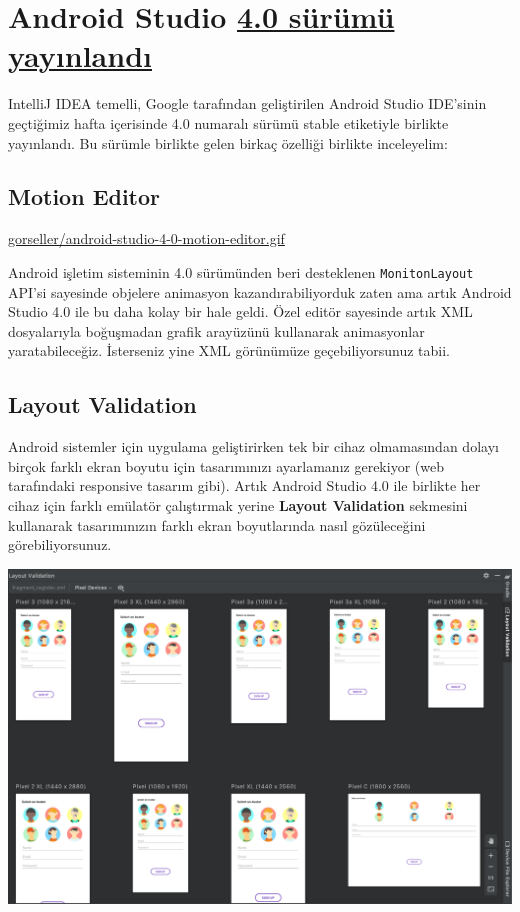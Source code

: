 \documentclass[11pt]{article}
\begin{document}
\section{Android Studio \href{https://android-developers.googleblog.com/2020/05/android-studio-4.html}{4.0 sürümü yayınlandı}}
\label{sec:org8a8a75c}
IntelliJ IDEA temelli, Google tarafından geliştirilen Android Studio IDE'sinin
geçtiğimiz hafta içerisinde 4.0 numaralı sürümü stable etiketiyle birlikte
yayınlandı. Bu sürümle birlikte gelen birkaç özelliği birlikte inceleyelim:

\subsection{Motion Editor}
\label{sec:org42453e6}
\url{gorseller/android-studio-4-0-motion-editor.gif}

Android işletim sisteminin 4.0 sürümünden beri desteklenen \texttt{MonitonLayout}
API'si sayesinde objelere animasyon kazandırabiliyorduk zaten ama artık
Android Studio 4.0 ile bu daha kolay bir hale geldi. Özel editör sayesinde
artık XML dosyalarıyla boğuşmadan grafik arayüzünü kullanarak animasyonlar
yaratabileceğiz. İsterseniz yine XML görünümüze geçebiliyorsunuz tabii.
\subsection{Layout Validation}
\label{sec:orgcc9f237}
Android sistemler için uygulama geliştirirken tek bir cihaz olmamasından
dolayı birçok farklı ekran boyutu için tasarımınızı ayarlamanız gerekiyor
(web tarafındaki responsive tasarım gibi). Artık Android Studio 4.0 ile
birlikte her cihaz için farklı emülatör çalıştırmak yerine \textbf{Layout
Validation} sekmesini kullanarak tasarımınızın farklı ekran boyutlarında
nasıl gözüleceğini görebiliyorsunuz.

\begin{center}
\includegraphics[width=.9\linewidth]{gorseller/android-studio-4-0-layout-validation.png}
\end{center}
\end{document}
